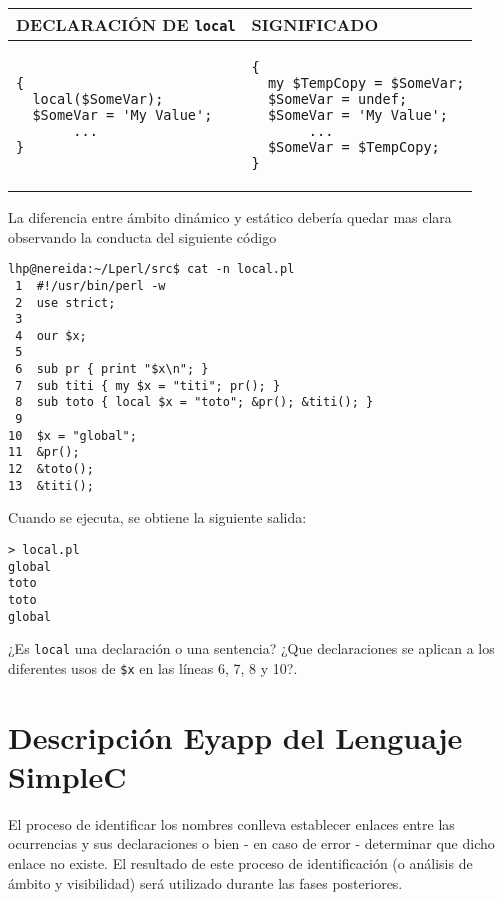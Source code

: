 \vspace{0.5cm}
\begin{center}
\begin{tabular}{|p{7cm}|p{7cm}|}
\hline
DECLARACI\'ON  DE \verb|local| & SIGNIFICADO\\
\hline
\begin{verbatim}
{
  local($SomeVar);
  $SomeVar = 'My Value';
       ...
}
\end{verbatim}
&
\begin{verbatim}
{
  my $TempCopy = $SomeVar;
  $SomeVar = undef;
  $SomeVar = 'My Value';
       ...
  $SomeVar = $TempCopy;
}
\end{verbatim}
\\
\hline
\end{tabular}
\end{center}
\vspace{0.5cm}

La diferencia entre ámbito dinámico y estático debería quedar mas clara observando
la conducta del siguiente código

\begin{verbatim}
lhp@nereida:~/Lperl/src$ cat -n local.pl
 1  #!/usr/bin/perl -w
 2  use strict;
 3
 4  our $x;
 5
 6  sub pr { print "$x\n"; }
 7  sub titi { my $x = "titi"; pr(); }
 8  sub toto { local $x = "toto"; &pr(); &titi(); }
 9
10  $x = "global";
11  &pr();
12  &toto();
13  &titi();
\end{verbatim}

Cuando se ejecuta, se obtiene la siguiente salida:

\begin{verbatim}
> local.pl
global
toto
toto
global
\end{verbatim}

\begin{exercise}
¿Es \verb|local| una declaración o una sentencia?
¿Que declaraciones se aplican a los diferentes 
usos de \verb|$x| en las líneas 6, 7, 8 y 10?.
\end{exercise}


\section{Descripción Eyapp del Lenguaje  SimpleC}
\label{section:simplec}
El proceso de identificar los nombres conlleva establecer enlaces
entre las ocurrencias y sus declaraciones o bien - en caso de error -
determinar que dicho enlace no existe. El resultado de este proceso
de identificación (o análisis de ámbito y visibilidad)
será utilizado durante las fases posteriores.

